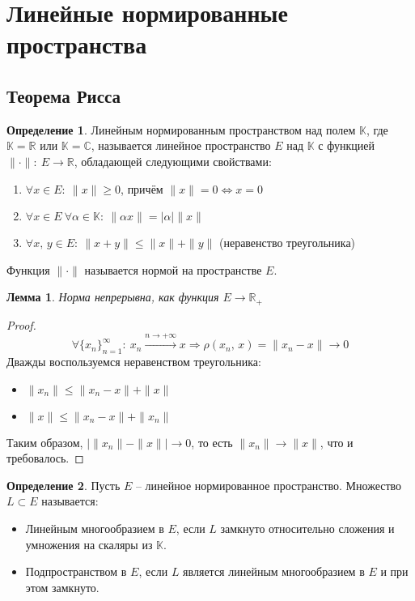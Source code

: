 \documentclass[a4paper,12pt]{article}
\renewcommand{\leq}{\ensuremath{\leqslant}}
\renewcommand{\geq}{\ensuremath{\geqslant}}
\theoremstyle{plain}
\newtheorem{lemma}{Лемма}[section]
\theoremstyle{definition}
\newtheorem{definition}{Определение}[section]
\theoremstyle{remark}
\begin{document}
\section{Линейные нормированные пространства}
\subsection{Теорема Рисса}
\begin{definition}
	Линейным нормированным пространством над полем $\mathbb{K}$, где $\mathbb{K} = \mathbb{R}$ или $\mathbb{K} = \mathbb{C}$, называется линейное пространство $E$ над $\mathbb{K}$ с функцией $\|\cdot\| :\: E \to \mathbb{R}$, обладающей следующими свойствами:
	\begin{enumerate}
		\item $\forall x \in E :\: \|x\| \geq 0$, причём $\|x\| = 0 \Leftrightarrow x = 0$
		\item $\forall x \in E \: \forall \alpha \in \mathbb{K} :\: \|\alpha x\| = \vert\alpha\vert\|x\|$
		\item $\forall x,\,y \in E :\: \|x + y\| \leq \|x\| + \|y\|$ (неравенство треугольника)
	\end{enumerate}
	Функция $\|\cdot\|$ называется нормой на пространстве $E$.
\end{definition}

\begin{lemma}\label{NormCont}
	Норма непрерывна, как функция $E \to \mathbb{R}_+$
\end{lemma}

\begin{proof}
	\[
		\forall \{x_n\}_{n=1}^\infty :\: x_n \overset{n \to +\infty}{\to} x \Rightarrow \rho(x_n,\, x) = \|x_n - x\| \to 0
	\]
	Дважды воспользуемся неравенством треугольника:
	\begin{itemize}
		\item $\|x_n\| \leq \|x_n - x\| + \|x\|$
		\item $\|x\| \leq \|x_n - x\| + \|x_n\|$
	\end{itemize}
	Таким образом, $\vert\|x_n\| - \|x\|\vert \to 0$, то есть $\|x_n\| \to \|x\|$, что и требовалось.
\end{proof}

\begin{definition}
	Пусть $E$ -- линейное нормированное пространство. Множество $L \subset E$ называется:
	\begin{itemize}
		\item Линейным многообразием в $E$, если $L$ замкнуто относительно сложения и умножения на скаляры из $\mathbb{K}$.
		\item Подпространством в $E$, если $L$ является линейным многообразием в $E$ и при этом замкнуто.
	\end{itemize}
\end{definition}
\end{document}
